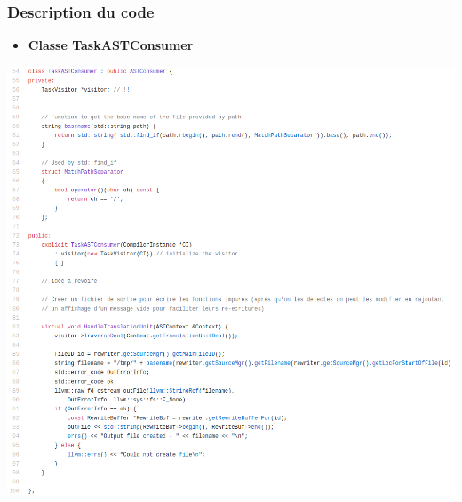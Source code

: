 \documentclass[hyperref={bookmarks=false},aspectratio=169]{beamer}
\begin{document}
\begin{frame}
\frametitle{Description du code}
\begin{itemize}
  \item \textbf{Classe TaskASTConsumer }
\end{itemize}
  \vfill
\begin{center} \includegraphics[scale=0.22]{./figures/class2.png} \\[2cm] \end{center}
\vfill



\end{frame}
\end{document}
